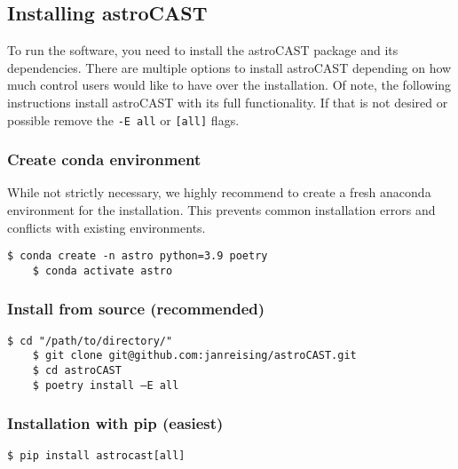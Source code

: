 \subsection{Installing \ac{astroCAST}}


To run the software, you need to install the astroCAST package and its dependencies. There are multiple options to
install \ac{astroCAST} depending on how much control users would like to have over the installation. Of note, the
following instructions install astroCAST with its full functionality. If that is not desired or possible remove the \lstinline[style=bashStyle]{-E all} or \lstinline[style=bashStyle]{[all]} flags.

\subsubsection{Create conda environment}
While not strictly necessary, we highly recommend to create a fresh anaconda environment for the installation. This
prevents common installation errors and conflicts with existing environments.

\begin{lstlisting}[style=bashStyle]
    $ conda create -n astro python=3.9 poetry
    $ conda activate astro
\end{lstlisting}

\subsubsection{Install from source (recommended)}
\label{res:install-from-source}
\begin{lstlisting}[style=bashStyle]
    $ cd "/path/to/directory/"
    $ git clone git@github.com:janreising/astroCAST.git
    $ cd astroCAST
    $ poetry install –E all
\end{lstlisting}

\subsubsection{Installation with pip (easiest)}
\begin{lstlisting}[style=bashStyle]
    $ pip install astrocast[all]
\end{lstlisting}

